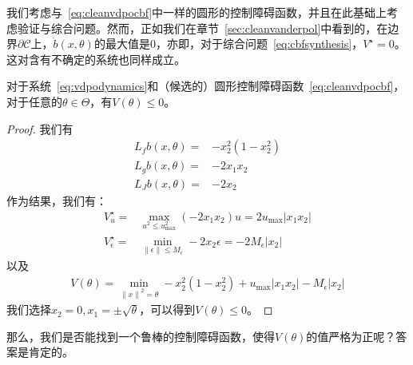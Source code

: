 我们考虑与~\eqref{eq:cleanvdpocbf}中一样的圆形的控制障碍函数，并且在此基础上考虑验证与综合问题。然而，正如我们在章节~\ref{sec:cleanvanderpol}中看到的，在边界$\partial \mathcal{C}$上，$\dot{b}(x, \theta)$的最大值是$0$，亦即，对于综合问题~\eqref{eq:cbfsynthesis}，$V^\star = 0$。这对含有不确定的系统也同样成立。

\begin{proposition}\label{prop:wrongvdpocbf}
    对于系统~\eqref{eq:vdpodynamics}和（候选的）圆形控制障碍函数~\eqref{eq:cleanvdpocbf}，对于任意的$\theta \in \Theta$，有$V(\theta) \le 0$。
\end{proposition}
\begin{proof}
    我们有
    \begin{subequations}
      \begin{eqnarray}
        L_fb(x, \theta) =& -x_2^2 (1 - x_2^2) \\
        L_gb(x, \theta) =& -2x_1 x_2 \\
        L_Jb(x, \theta) =& -2x_2
      \end{eqnarray}
    \end{subequations}
    作为结果，我们有：
    \begin{subequations}
      \begin{eqnarray}
        V_u^\star =& \displaystyle \max_{u^2 \le u_{\max}^2} (-2 x_1 x_2) u 
        = 2 u_{\max} |x_1 x_2| \\
        V_\epsilon^\star =& \displaystyle \min_{
          \left\lVert \epsilon \right\rVert \le M_\epsilon
        } -2 x_2 \epsilon 
        = -2 M_\epsilon |x_2|
      \end{eqnarray}
    \end{subequations}
    以及
    \begin{eqnarray}
      V(\theta) = \min_{\left\lVert x \right\rVert^2 = \theta} 
      -x_2^2 (1 - x_2^2) + u_{\max} |x_1 x_2| - M_\epsilon |x_2|
    \end{eqnarray}
    我们选择$x_2 = 0, x_1 = \pm \sqrt{\theta}$，可以得到$V(\theta) \le 0$。
  \end{proof}

那么，我们是否能找到一个鲁棒的控制障碍函数，使得$V(\theta)$的值严格为正呢？答案是肯定的。

